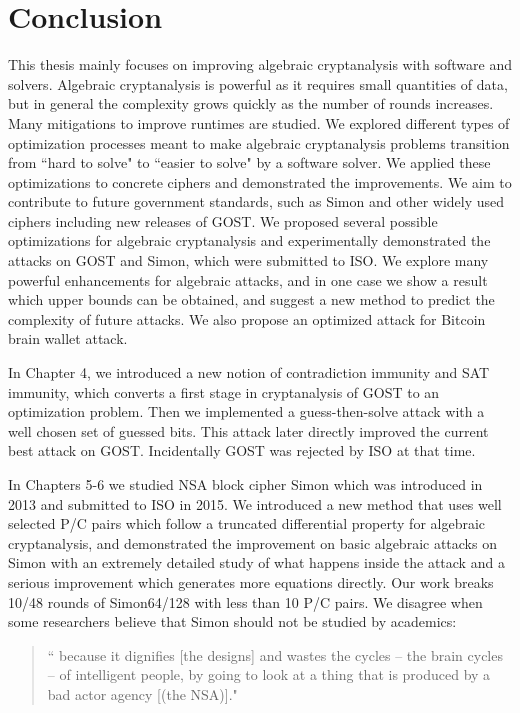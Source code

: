 \chapter{Conclusion}
\label{chapterlabel4}

This thesis mainly focuses on improving algebraic cryptanalysis with software and solvers. Algebraic cryptanalysis is powerful as it requires small quantities of data, but in general the complexity grows quickly as the number of rounds increases. Many mitigations to improve runtimes are studied. 
We explored different types of optimization processes meant to make algebraic cryptanalysis problems transition from ``hard to solve" to ``easier to solve" by a software solver. We applied these optimizations to concrete ciphers and demonstrated the improvements. We aim to contribute to future government standards, such as Simon and other widely used ciphers including new releases of GOST.  We proposed several possible optimizations for algebraic cryptanalysis and experimentally demonstrated the attacks on GOST and Simon, which were submitted to ISO. We explore many powerful enhancements for algebraic attacks, and in one case we show a result which upper bounds can be obtained, and suggest a new method to predict the complexity of future attacks. 
We also propose an optimized attack for Bitcoin brain wallet attack.  

In Chapter 4, we introduced a new notion of contradiction immunity and SAT immunity, which converts a first stage in cryptanalysis of GOST to an optimization problem. Then we implemented a guess-then-solve attack with a well chosen set of guessed bits. This attack later directly improved the current best attack on GOST. Incidentally GOST was rejected by ISO at that time. 

In Chapters 5-6 we studied NSA block cipher Simon which was introduced in 2013 and submitted to ISO in 2015. 
We introduced a new method that uses well selected P/C pairs which follow a truncated differential property for algebraic cryptanalysis, and demonstrated the improvement on basic algebraic attacks on Simon with an extremely detailed study of what happens inside the attack and a serious improvement which generates more equations directly. Our work breaks 10/48 rounds of Simon64/128 with less than 10 P/C pairs.
We disagree when some researchers believe that Simon should not be studied by academics: 

\begin{quotation}
	``%
	because it dignifies [the designs] and wastes the cycles – the brain cycles – of intelligent people, by going to look at a thing that is produced by a bad actor agency [(the NSA)]." \\ 
\end{quotation}

